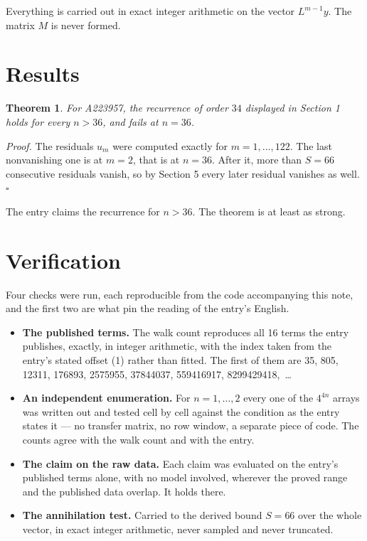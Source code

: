 \documentclass[11pt]{article}
\newtheorem{theorem}{Theorem}
\theoremstyle{definition}
\begin{document}
Everything is carried out in exact integer arithmetic on the vector $L^{m-1}y$. The matrix $M$ is never formed.

\section{Results}

\begin{theorem} For A223957, the recurrence of order $34$ displayed in Section 1 holds for every $n > 36$, and fails at $n = 36$.\end{theorem}

{\itshape Proof.} The residuals $u_m$ were computed exactly for $m = 1,\dots,122$. The last nonvanishing one is at $m = 2$, that is at $n = 36$. After it, more than $S = 66$ consecutive residuals vanish, so by Section 5 every later residual vanishes as well. $\square$

The entry claims the recurrence for $n > 36$. The theorem is at least as strong.

\section{Verification}

Four checks were run, each reproducible from the code accompanying this note, and the first two are what pin the reading of the entry's English.

\begin{itemize}

\item {\bfseries The published terms.} The walk count reproduces all 16 terms the entry publishes, exactly, in integer arithmetic, with the index taken from the entry's stated offset (1) rather than fitted. The first of them are 35, 805, 12311, 176893, 2575955, 37844037, 559416917, 8299429418,~\dots

\item {\bfseries An independent enumeration.} For $n = 1,\dots,2$ every one of the $4^{4n}$ arrays was written out and tested cell by cell against the condition as the entry states it --- no transfer matrix, no row window, a separate piece of code. The counts agree with the walk count and with the entry.

\item {\bfseries The claim on the raw data.} Each claim was evaluated on the entry's published terms alone, with no model involved, wherever the proved range and the published data overlap. It holds there.

\item {\bfseries The annihilation test.} Carried to the derived bound $S = 66$ over the whole vector, in exact integer arithmetic, never sampled and never truncated.

\end{itemize}
\end{document}
